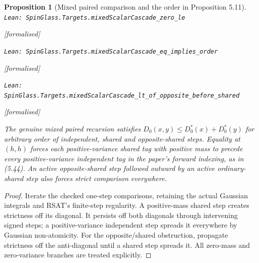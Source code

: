 \documentclass[11pt]{article}
\providecommand{\lean}[1]{\leavevmode\par\nopagebreak
  {\noindent\normalfont\footnotesize\raggedright\texttt{Lean: #1}\par}\nopagebreak}
\providecommand{\leanok}{\par\nopagebreak
  {\noindent\normalfont\footnotesize\textcolor{green!50!black}{[formalised]}\par}\nopagebreak}
\newtheorem{proposition}[theorem]{Proposition}
\begin{document}
\begin{proposition}[Mixed paired comparison and the order in Proposition 5.11]
\lean{SpinGlass.Targets.mixedScalarCascade\_zero\_le}\leanok
\lean{SpinGlass.Targets.mixedScalarCascade\_eq\_implies\_order}\leanok
\lean{SpinGlass.Targets.mixedScalarCascade\_lt\_of\_opposite\_before\_shared}\leanok
The genuine mixed paired recursion satisfies
$D_0(x,y)\le D_0^*(x)+D_0^*(y)$ for arbitrary order of independent, shared
and opposite-shared steps. Equality at $(h,h)$ forces each positive-variance
shared tag with positive mass to precede every positive-variance independent
tag in the paper's forward indexing, as in (5.44).
An active opposite-shared step followed outward by an active ordinary-shared
step also forces strict comparison everywhere.
\end{proposition}
\begin{proof}
Iterate the checked one-step comparisons, retaining the actual Gaussian
integrals and RSAT's finite-step regularity. A positive-mass shared step
creates strictness off its diagonal. It persists off both diagonals through
intervening signed steps; a positive-variance independent step spreads it
everywhere by Gaussian non-atomicity. For the opposite/shared obstruction,
propagate strictness off the anti-diagonal until a shared step spreads it.
All zero-mass and zero-variance branches are treated explicitly.
\end{proof}
\end{document}
